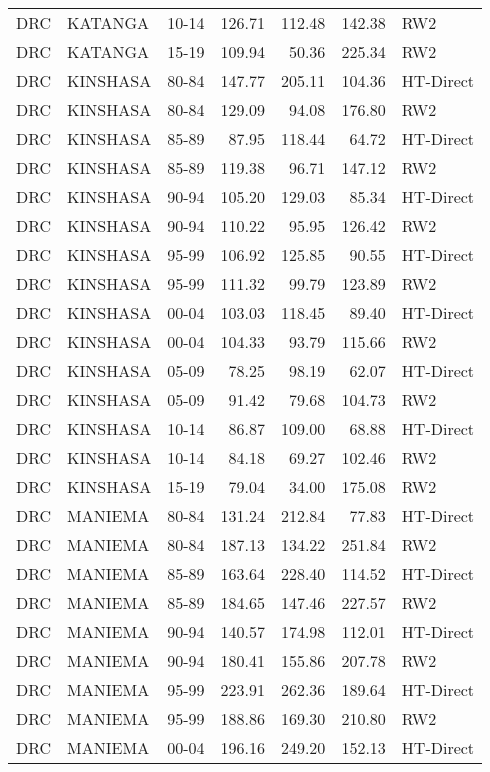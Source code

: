 \begin{longtable}{lllrrrl}
  DRC & KATANGA & 10-14 & 126.71 & 112.48 & 142.38 & RW2 \\ 
  DRC & KATANGA & 15-19 & 109.94 & 50.36 & 225.34 & RW2 \\ 
  DRC & KINSHASA & 80-84 & 147.77 & 205.11 & 104.36 & HT-Direct \\ 
  DRC & KINSHASA & 80-84 & 129.09 & 94.08 & 176.80 & RW2 \\ 
  DRC & KINSHASA & 85-89 & 87.95 & 118.44 & 64.72 & HT-Direct \\ 
  DRC & KINSHASA & 85-89 & 119.38 & 96.71 & 147.12 & RW2 \\ 
  DRC & KINSHASA & 90-94 & 105.20 & 129.03 & 85.34 & HT-Direct \\ 
  DRC & KINSHASA & 90-94 & 110.22 & 95.95 & 126.42 & RW2 \\ 
  DRC & KINSHASA & 95-99 & 106.92 & 125.85 & 90.55 & HT-Direct \\ 
  DRC & KINSHASA & 95-99 & 111.32 & 99.79 & 123.89 & RW2 \\ 
  DRC & KINSHASA & 00-04 & 103.03 & 118.45 & 89.40 & HT-Direct \\ 
  DRC & KINSHASA & 00-04 & 104.33 & 93.79 & 115.66 & RW2 \\ 
  DRC & KINSHASA & 05-09 & 78.25 & 98.19 & 62.07 & HT-Direct \\ 
  DRC & KINSHASA & 05-09 & 91.42 & 79.68 & 104.73 & RW2 \\ 
  DRC & KINSHASA & 10-14 & 86.87 & 109.00 & 68.88 & HT-Direct \\ 
  DRC & KINSHASA & 10-14 & 84.18 & 69.27 & 102.46 & RW2 \\ 
  DRC & KINSHASA & 15-19 & 79.04 & 34.00 & 175.08 & RW2 \\ 
  DRC & MANIEMA & 80-84 & 131.24 & 212.84 & 77.83 & HT-Direct \\ 
  DRC & MANIEMA & 80-84 & 187.13 & 134.22 & 251.84 & RW2 \\ 
  DRC & MANIEMA & 85-89 & 163.64 & 228.40 & 114.52 & HT-Direct \\ 
  DRC & MANIEMA & 85-89 & 184.65 & 147.46 & 227.57 & RW2 \\ 
  DRC & MANIEMA & 90-94 & 140.57 & 174.98 & 112.01 & HT-Direct \\ 
  DRC & MANIEMA & 90-94 & 180.41 & 155.86 & 207.78 & RW2 \\ 
  DRC & MANIEMA & 95-99 & 223.91 & 262.36 & 189.64 & HT-Direct \\ 
  DRC & MANIEMA & 95-99 & 188.86 & 169.30 & 210.80 & RW2 \\ 
  DRC & MANIEMA & 00-04 & 196.16 & 249.20 & 152.13 & HT-Direct \\ 

\end{longtable}
